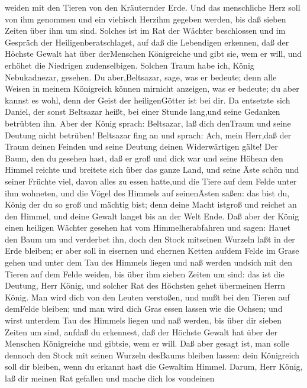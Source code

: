 weiden mit den Tieren von den Kräuternder Erde.  Und das
menschliche Herz soll von ihm genommen und ein viehisch Herzihm gegeben
werden, bis daß sieben Zeiten über ihm um sind.  Solches
ist im Rat der Wächter beschlossen und im Gespräch der
Heiligenberatschlaget, auf daß die Lebendigen erkennen, daß der Höchste
Gewalt hat über derMenschen Königreiche und gibt sie, wem er will, und
erhöhet die Niedrigen zudenselbigen.  Solchen Traum habe
ich, König Nebukadnezar, gesehen. Du aber,Beltsazar, sage, was er
bedeute; denn alle Weisen in meinem Königreich können mirnicht anzeigen,
was er bedeute; du aber kannst es wohl, denn der Geist der
heiligenGötter ist bei dir.  Da entsetzte sich Daniel, der
sonst Beltsazar heißt, bei einer Stunde lang,und seine Gedanken
betrübten ihn. Aber der König sprach: Beltsazar, laß dich denTraum und
seine Deutung nicht betrüben! Beltsazar fing an und sprach: Ach, mein
Herr,daß der Traum deinen Feinden und seine Deutung deinen Widerwärtigen
gälte!  Der Baum, den du gesehen hast, daß er groß und dick
war und seine Höhean den Himmel reichte und breitete sich über das ganze
Land,  und seine Äste schön und seiner Früchte viel, davon
alles zu essen hatte,und die Tiere auf dem Felde unter ihm wohneten, und
die Vögel des Himmels auf seinenÄsten saßen:  das bist du,
König der du so groß und mächtig bist; denn deine Macht istgroß und
reichet an den Himmel, und deine Gewalt langet bis an der Welt Ende.
 Daß aber der König einen heiligen Wächter gesehen hat vom
Himmelherabfahren und sagen: Hauet den Baum um und verderbet ihn, doch
den Stock mitseinen Wurzeln laßt in der Erde bleiben; er aber soll in
eisernen und ehernen Ketten aufdem Felde im Grase gehen und unter dem
Tau des Himmels liegen und naß werden undsich mit den Tieren auf dem
Felde weiden, bis über ihm sieben Zeiten um sind:  das ist
die Deutung, Herr König, und solcher Rat des Höchsten gehet übermeinen
Herrn König.  Man wird dich von den Leuten verstoßen, und
mußt bei den Tieren auf demFelde bleiben; und man wird dich Gras essen
lassen wie die Ochsen; und wirst unterdem Tau des Himmels liegen und naß
werden, bis über dir sieben Zeiten um sind, aufdaß du erkennest, daß der
Höchste Gewalt hat über der Menschen Königreiche und gibtsie, wem er
will.  Daß aber gesagt ist, man solle dennoch den Stock mit
seinen Wurzeln desBaums bleiben lassen: dein Königreich soll dir
bleiben, wenn du erkannt hast die Gewaltim Himmel.  Darum,
Herr König, laß dir meinen Rat gefallen und mache dich los vondeinen
